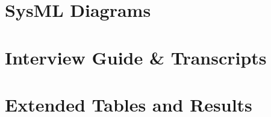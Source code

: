 \section*{SysML Diagrams}
\label{app:sysml}

\section*{Interview Guide \& Transcripts}
\label{app:interviews}

\section*{Extended Tables and Results}
\label{app:tables}


